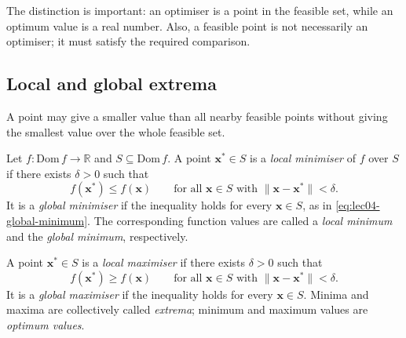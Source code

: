 The distinction is important: an optimiser is a point in the feasible set, while an optimum value is a real number. Also, a feasible point is not necessarily an optimiser; it must satisfy the required comparison.

\subsection{Local and global extrema}

A point may give a smaller value than all nearby feasible points without giving the smallest value over the whole feasible set.

\begin{definition}
	Let $f:\mathrm{Dom}\,f\to\mathbb{R}$ and $S\subseteq\mathrm{Dom}\,f$. A point $\mathbf{x}^*\in S$ is a \emph{local minimiser} of $f$ over $S$ if there exists $\delta>0$ such that
	\begin{equation}
		f(\mathbf{x}^*)\leq f(\mathbf{x})
		\qquad\text{for all }\mathbf{x}\in S
		\text{ with }\|\mathbf{x}-\mathbf{x}^*\|<\delta.
		\label{eq:lec04-local-minimum}
	\end{equation}
	It is a \emph{global minimiser} if the inequality holds for every $\mathbf{x}\in S$, as in \eqref{eq:lec04-global-minimum}. The corresponding function values are called a \emph{local minimum} and the \emph{global minimum}, respectively.
\end{definition}

\begin{definition}
	A point $\mathbf{x}^*\in S$ is a \emph{local maximiser} if there exists $\delta>0$ such that
	\begin{equation}
		f(\mathbf{x}^*)\geq f(\mathbf{x})
		\qquad\text{for all }\mathbf{x}\in S
		\text{ with }\|\mathbf{x}-\mathbf{x}^*\|<\delta.
		\label{eq:lec04-local-maximum}
	\end{equation}
	It is a \emph{global maximiser} if the inequality holds for every $\mathbf{x}\in S$. Minima and maxima are collectively called \emph{extrema}; minimum and maximum values are \emph{optimum values}.
\end{definition}

